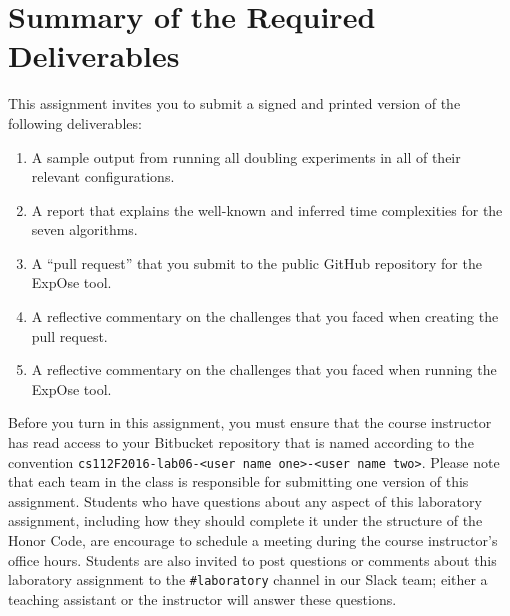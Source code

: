 \section*{Summary of the Required Deliverables}

This assignment invites you to submit a signed and printed version of the following deliverables:

\vspace*{-.05in}

\begin{enumerate}

  \itemsep0in

  \item A sample output from running all doubling experiments in all of their relevant configurations.

  \item A report that explains the well-known and inferred time complexities for the seven algorithms.

  \item A ``pull request'' that you submit to the public GitHub repository for the {\sc ExpOse} tool.

  \item A reflective commentary on the challenges that you faced when creating the pull request.

  \item A reflective commentary on the challenges that you faced when running the {\sc ExpOse} tool.


\end{enumerate}

\vspace*{-.05in}

Before you turn in this assignment, you must ensure that the course instructor has read access to your Bitbucket
repository that is named according to the convention {\tt cs112F2016-lab06-<user name one>-<user name two>}. Please note
that each team in the class is responsible for submitting one version of this assignment. Students who have questions
about any aspect of this laboratory assignment, including how they should complete it under the structure of the Honor
Code, are encourage to schedule a meeting during the course instructor's office hours. Students are also invited to
post questions or comments about this laboratory assignment to the {\tt \#laboratory} channel in our Slack team; either
a teaching assistant or the instructor will answer these questions.


